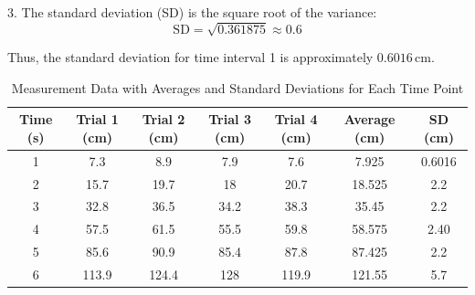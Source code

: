 \documentclass[12pt, letterpaper]{article}
\begin{document}
3. The standard deviation (SD) is the square root of the variance:
   \[
   \text{SD} = \sqrt{0.361875} \approx 0.6
   \]

Thus, the standard deviation for time interval 1 is approximately \( 0.6016 \, \text{cm} \).


\begin{table}[h!]
\centering
\begin{tabular}{|@{}c@{}|@{}c@{}|@{}c@{}|@{}c@{}|@{}c@{}|@{}c@{}|@{}c@{}|@{}}
\hline
\textbf{Time (s)} & \textbf{Trial 1 (cm)} & \textbf{Trial 2 (cm)} & \textbf{Trial 3 (cm)} & \textbf{Trial 4 (cm)} & \textbf{Average (cm)} & \textbf{SD (cm)} \\ \hline
1                 & 7.3                   & 8.9                   & 7.9                   & 7.6                   & 7.925                 & 0.6016           \\ \hline
2                 & 15.7                  & 19.7                  & 18                    & 20.7                  & 18.525                & 2.2           \\ \hline
3                 & 32.8                  & 36.5                  & 34.2                  & 38.3                  & 35.45                 & 2.2           \\ \hline
4                 & 57.5                  & 61.5                  & 55.5                  & 59.8                  & 58.575                & 2.40           \\ \hline
5                 & 85.6                  & 90.9                  & 85.4                  & 87.8                  & 87.425                & 2.2           \\ \hline
6                 & 113.9                 & 124.4                 & 128                   & 119.9                 & 121.55                & 5.7           \\ \hline
\end{tabular}
\caption{Measurement Data with Averages and Standard Deviations for Each Time Point}

\bigbreak


\end{table}
\end{document}
